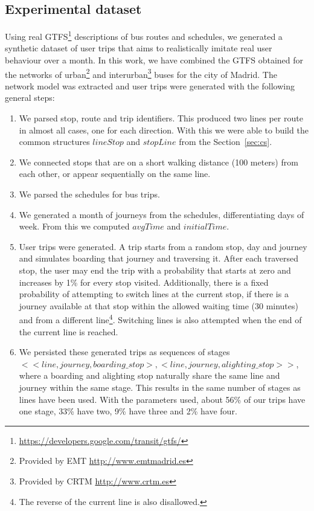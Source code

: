     \subsection{Experimental dataset}
    \label{sec:newctr:exp:data}
    Using real GTFS\footnote{\url{https://developers.google.com/transit/gtfs/}} descriptions of bus routes and schedules, we generated a synthetic dataset of user trips that aims to realistically imitate real user behaviour over a month. In this work, we have combined the GTFS obtained for the networks of urban\footnote{Provided by EMT \url{http://www.emtmadrid.es}} and interurban\footnote{Provided by CRTM \url{http://www.crtm.es}} buses for the city of Madrid. The network model was extracted and user trips were generated with the following general steps:
    
    \begin{enumerate}
        \item We parsed stop, route and trip identifiers. This produced two lines per route in almost all cases, one for each direction. With this we were able to build the common structures $lineStop$ and $stopLine$ from the Section~\ref{sec:cs}.
        \item We connected stops that are on a short walking distance (100 meters) from each other, or appear sequentially on the same line.
        \item We parsed the schedules for bus trips.
        \item We generated a month of journeys from the schedules, differentiating days of week. From this we computed $avgTime$ and $initialTime$.
        \item User trips were generated. A trip starts from a random stop, day and journey and simulates boarding that journey and traversing it. After each traversed stop, the user may end the trip with a probability that starts at zero and increases by 1\% for every stop visited. Additionally, there is a fixed probability of attempting to switch lines at the current stop, if there is a journey available at that stop within the allowed waiting time (30 minutes) and from a different line\footnote{The reverse of the current line is also disallowed.}. Switching lines is also attempted when the end of the current line is reached.
        \item We persisted these generated trips as sequences of stages \\ $<<line,journey,boarding\_stop>, <line,journey,alighting\_stop>>$,\\ where a boarding and alighting stop naturally share the same line and journey within the same stage. This results in the same number of stages as lines have been used. With the parameters used, about 56\% of our trips have one stage, 33\% have two, 9\% have three and 2\% have four.
    \end{enumerate}
    

